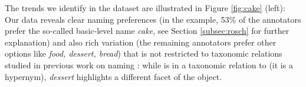 The trends we identify in the dataset are illustrated in Figure \ref{fig:cake} (left): Our data reveals clear naming preferences (in the example, 53\% of the annotators prefer the so-called basic-level name \textit{cake}, see Section \ref{subsec:rosch} for further explanation) and also rich variation (the remaining annotators prefer other options like \textit{food, dessert, bread}) that is not restricted to taxonomic relations studied in previous work on naming \cite{Ordonez:2016,graf2016animal}: while  is in a taxonomic relation to  (it is a hypernym), \textit{dessert} highlights a different facet of the object.

